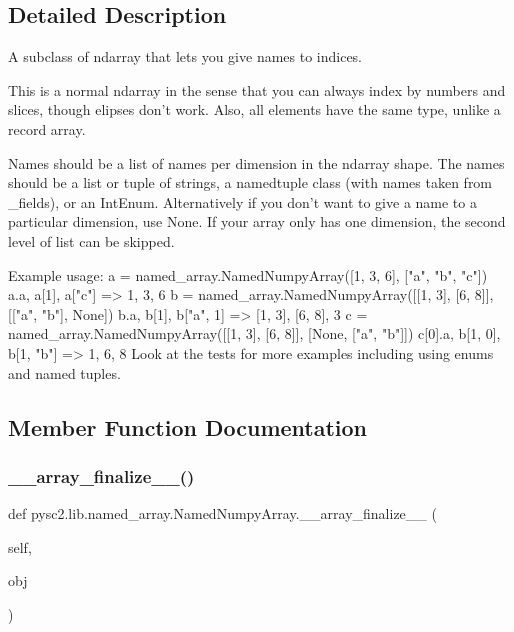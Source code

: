 \subsection{Detailed Description}
\begin{DoxyVerb}A subclass of ndarray that lets you give names to indices.

This is a normal ndarray in the sense that you can always index by numbers and
slices, though elipses don't work. Also, all elements have the same type,
unlike a record array.

Names should be a list of names per dimension in the ndarray shape. The names
should be a list or tuple of strings, a namedtuple class (with names taken
from _fields), or an IntEnum. Alternatively if you don't want to give a name
to a particular dimension, use None. If your array only has one dimension, the
second level of list can be skipped.

Example usage:
  a = named_array.NamedNumpyArray([1, 3, 6], ["a", "b", "c"])
  a.a, a[1], a["c"] => 1, 3, 6
  b = named_array.NamedNumpyArray([[1, 3], [6, 8]], [["a", "b"], None])
  b.a, b[1], b["a", 1] => [1, 3], [6, 8], 3
  c = named_array.NamedNumpyArray([[1, 3], [6, 8]], [None, ["a", "b"]])
  c[0].a, b[1, 0], b[1, "b"] => 1, 6, 8
Look at the tests for more examples including using enums and named tuples.
\end{DoxyVerb}
 

\subsection{Member Function Documentation}
\mbox{\label{classpysc2_1_1lib_1_1named__array_1_1_named_numpy_array_a2bd5549c57fae992baaa4c99a0e3bcfb}} 
\subsubsection{\texorpdfstring{\+\_\+\+\_\+array\+\_\+finalize\+\_\+\+\_\+()}{\_\_array\_finalize\_\_()}}
{\footnotesize\ttfamily def pysc2.\+lib.\+named\+\_\+array.\+Named\+Numpy\+Array.\+\_\+\+\_\+array\+\_\+finalize\+\_\+\+\_\+ (\begin{DoxyParamCaption}\item[{}]{self,  }\item[{}]{obj }\end{DoxyParamCaption})}

